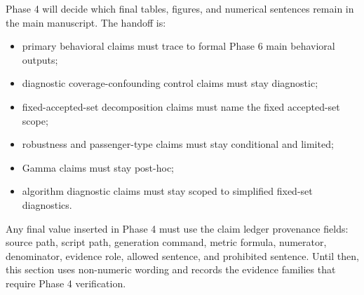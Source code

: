 Phase 4 will decide which final tables, figures, and numerical sentences remain in the
main manuscript. The handoff is:
\begin{itemize}
  \item primary behavioral claims must trace to formal Phase 6 main behavioral outputs;
  \item diagnostic coverage-confounding control claims must stay diagnostic;
  \item fixed-accepted-set decomposition claims must name the fixed accepted-set scope;
  \item robustness and passenger-type claims must stay conditional and limited;
  \item Gamma claims must stay post-hoc;
  \item algorithm diagnostic claims must stay scoped to simplified fixed-set diagnostics.
\end{itemize}
Any final value inserted in Phase 4 must use the claim ledger provenance fields:
source path, script path, generation command, metric formula, numerator, denominator,
evidence role, allowed sentence, and prohibited sentence. Until then, this section uses
non-numeric wording and records the evidence families that require Phase 4 verification.
